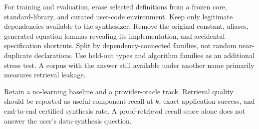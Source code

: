 For training and evaluation, erase selected definitions from a frozen core, standard-library, and curated user-code environment. Keep only legitimate dependencies available to the synthesizer. Remove the original constant, aliases, generated equation lemmas revealing its implementation, and accidental specification shortcuts. Split by dependency-connected families, not random near-duplicate declarations. Use held-out types and algorithm families as an additional stress test. A corpus with the answer still available under another name primarily measures retrieval leakage.

Retain a no-learning baseline and a provider-oracle track. Retrieval quality should be reported as useful-component recall at $k$, exact application success, and end-to-end certified synthesis rate. A proof-retrieval recall score alone does not answer the user's data-synthesis question.
